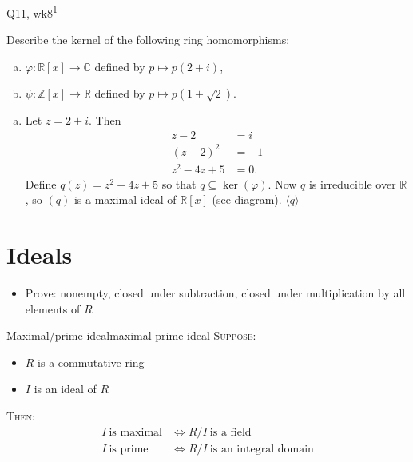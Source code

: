 \begin{problem}{Q11, wk8\textsuperscript{1}}{}


    Describe the kernel of the following ring homomorphisms:
    \begin{enumerate}[a)]
        \item $\varphi : \mathbb{R}[x] \to \mathbb{C}$ defined by $p \mapsto p(2 + i)$,
        \item $\psi : \mathbb{Z}[x] \to \mathbb{R}$ defined by $p \mapsto p(1 + \sqrt{2})$.
    \end{enumerate}

    \hrulefill

    \begin{enumerate}[a)]
        \item Let $z = 2 + i$. Then
                \begin{align}
                    z - 2 &= i \\
                    (z - 2)^2 &= -1 \\
                    z^2 - 4z + 5 &= 0 .
                \end{align}
            Define $q(z) = z^2 - 4z + 5$ so that $q \subseteq \ker(\varphi)$. Now $q$ is irreducible over $\mathbb{R}$, so $(q)$ is a maximal ideal of $\mathbb{R}[x]$ (see diagram).  $\langle q \rangle$ 
    \end{enumerate}

\end{problem}

\section{Ideals}

\begin{itemize}
    \item Prove: nonempty, closed under subtraction, closed under multiplication by all elements of $R$
\end{itemize}

\begin{proposition}{Maximal/prime ideal}{maximal-prime-ideal}
    \textsc{Suppose}:
        \begin{itemize}
            \item $R$ is a commutative ring
            \item $I$ is an ideal of $R$
        \end{itemize}
    \textsc{Then}:
        \begin{align*}
            I \ \text{is maximal} &\iff R/I \ \text{is a field} \\
            I \ \text{is prime}   &\iff R/I \ \text{is an integral domain}            
        \end{align*}
\end{proposition}

